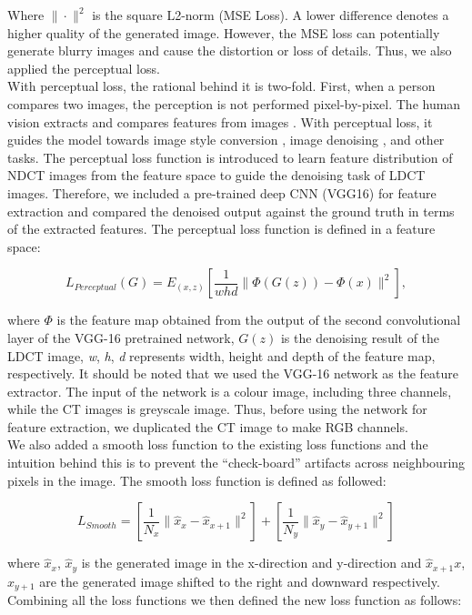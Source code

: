 \documentclass[journal]{IEEEtran}
\begin{document}
Where $\|\cdot\|^2$ is the square L2-norm (MSE Loss).  A lower difference denotes a higher quality of the generated image.  However, the MSE loss can potentially generate blurry images and cause the distortion or loss of details.  Thus, we also applied the perceptual loss.\\
	With perceptual loss, the rational behind it is two-fold.  First, when a person compares two images, the perception is not performed pixel-by-pixel.  The human vision extracts and compares features from images \cite{nixon2019feature}.  With perceptual loss, it guides the model towards image style conversion \cite{johnson2016perceptual}, image denoising \cite{8340157}, and other tasks.  The perceptual loss function is introduced to learn feature distribution of NDCT images from the feature space to guide the denoising task of LDCT images.  Therefore, we included a pre-trained deep CNN (VGG16) for feature extraction and compared the denoised output against the ground truth in terms of the extracted features.  The perceptual loss function is defined in a feature space:
	
\begin{equation}
	L_{Perceptual}(G) = E_{(x,z)}\left[ \frac{1}{whd}\|\Phi(G(z))-\Phi(x)\|^2 \right],
\end{equation}

	where $\Phi$ is the feature map obtained from the output of the second convolutional layer of the VGG-16 pretrained network, $G(z)$ is the denoising result of the LDCT image, \emph{w}, \emph{h}, \emph{d} represents width, height and depth of the feature map, respectively.  It should be noted that we used the VGG-16 network as the feature extractor.  The input of the network is a colour image, including three channels, while the CT images is greyscale image.  Thus, before using the network for feature extraction, we duplicated the CT image to make RGB channels.\\
	We also added a smooth loss function to the existing loss functions and the intuition behind this is to prevent the ``check-board'' artifacts across neighbouring pixels in the image.  The smooth loss function is defined as followed:

\begin{equation}
	L_{Smooth} = \left[ \frac{1}{N_x}\|\hat{x}_x - \hat{x}_{x+1}\|^2 \right]+ \left[ \frac{1}{N_y}\|\hat{x}_y - \hat{x}_{y+1}\|^2 \right]
\end{equation}

	where $\hat{x}_x$, $\hat{x}_y$ is the generated image in the x-direction and y-direction and $\hat{x}_{x+1}x$, $\hat{x}_{y+1}$ are the generated image shifted to the right and downward respectively.
	Combining all the loss functions we then defined the new loss function as follows:
	
\end{document}
